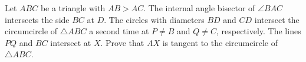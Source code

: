 Let $ABC$ be a triangle with $AB > AC$. The internal angle bisector of $\angle BAC$ intersects the side $BC$ at $D$. The circles with diameters $BD$ and $CD$ intersect the circumcircle of $\triangle ABC$ a second time at $P \not= B$ and $Q \not= C$, respectively. The lines $PQ$ and $BC$ intersect at $X$. Prove that $AX$ is tangent to the circumcircle of $\triangle ABC$.